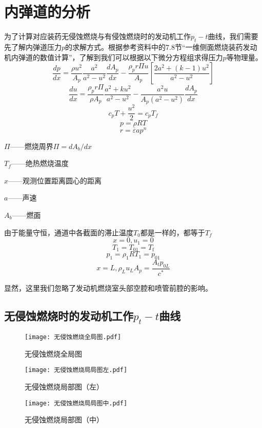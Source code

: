 
\chapter{内弹道的分析}

为了计算对应装药无侵蚀燃烧与有侵蚀燃烧时的发动机工作$p_{t}-t$曲线，我们需要先了解内弹道压力$p$的求解方式。根据参考资料\citep{tangjinlan}中的7.8节“一维侧面燃烧装药发动机内弹道的数值计算”，了解到我们可以根据以下微分方程组求得压力$p$等物理量。
\[
\frac{dp}{dx}=\frac{\rho u^2}{A_p}\frac{a^2}{a^2-u^2}\frac{dA_p}{dx}-\frac{\rho _pr\Pi u}{A_p}\left[ \frac{2a^2+\left( k-1 \right) u^2}{a^2-u^2} \right] 
\]
\[
\frac{du}{dx}=\frac{\rho _pr\Pi}{\rho A_p}\frac{a^2+ku^2}{a^2-u^2}-\frac{a^2u}{A_p\left( a^2-u^2 \right)}\frac{dA_p}{dx}
\]
\[
c_pT+\frac{u^2}{2}=c_pT_f
\]
\[
p=\rho RT
\]
\[
r=\overline{\varepsilon} ap^n
\]

$\Pi$——燃烧周界$\Pi =dA_b/dx$

$T_{f}$——绝热燃烧温度

$x$——观测位置距离圆心的距离

$a$——声速

$A_{b}$——燃面

由于能量守恒，通道中各截面的滞止温度$T_{0}$都是一样的，都等于$T_{f}$
\[
x=0,u_1=0
\]
\[
T_1=T_{01}=T_{\mathrm{f}}
\]
\[
p_1=\rho _1RT_1=p_{01}
\]
\[
x=L,\rho _Lu_LA_p=\frac{A_tp_{0L}}{c^*}
\]

显然，这里我们忽略了发动机燃烧室头部空腔和喷管前腔的影响。

\section{无侵蚀燃烧时的发动机工作$p_{t}-t$曲线}

\begin{figure}[H]
    \centering
    \texttt{[image: 无侵蚀燃烧全局图.pdf]}
    \caption{无侵蚀燃烧全局图}
    \label{fig:example}
  \end{figure}
\vspace{1em}
\begin{figure}[!h]
    \centering
    \texttt{[image: 无侵蚀燃烧局局图左.pdf]}
    \caption{无侵蚀燃烧局部图（左）}
    \label{fig:example}
  \end{figure}

\begin{figure}[!h]
    \centering
    \texttt{[image: 无侵蚀燃烧局局图中.pdf]}
    \caption{无侵蚀燃烧局部图（中）}
    \label{fig:example}
  \end{figure}

